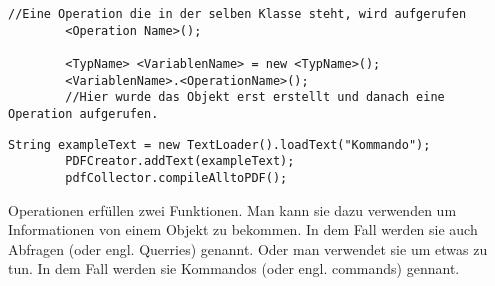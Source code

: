 \begin{enumerate}
\begin{lstlisting}[title=\textbf{Kommando Syntax},firstnumber=4]
        //Eine Operation die in der selben Klasse steht, wird aufgerufen
        <Operation Name>(); 

        <TypName> <VariablenName> = new <TypName>();
        <VariablenName>.<OperationName>();
        //Hier wurde das Objekt erst erstellt und danach eine Operation aufgerufen.
            \end{lstlisting}
          \begin{lstlisting}[title=\textbf{Beispiel 3/3 Kommandos},firstnumber=3,frame=lbr]
        String exampleText = new TextLoader().loadText("Kommando");
        PDFCreator.addText(exampleText);
        pdfCollector.compileAlltoPDF();
              \end{lstlisting}
          \begin{Infobox}[Operationen]
              Operationen erfüllen zwei Funktionen. Man kann sie dazu verwenden um Informationen von einem Objekt zu bekommen.
              In dem Fall werden sie auch Abfragen (oder engl. Querries) genannt.
              Oder man verwendet sie um etwas zu tun. In dem Fall werden sie Kommandos (oder engl. commands) gennant.
          \end{Infobox}



\end{enumerate}
